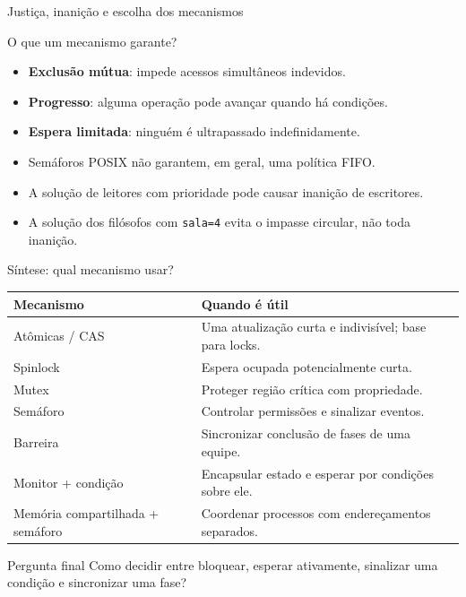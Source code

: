 \documentclass[aspectratio=169,11pt]{beamer}
\begin{document}
\begin{frame}{Justiça, inanição e escolha dos mecanismos}
\small
\begin{block}{O que um mecanismo garante?}
\begin{itemize}
\item \textbf{Exclusão mútua}: impede acessos simultâneos indevidos.
\item \textbf{Progresso}: alguma operação pode avançar quando há condições.
\item \textbf{Espera limitada}: ninguém é ultrapassado indefinidamente.
\end{itemize}
\end{block}
\begin{itemize}
\item Semáforos POSIX não garantem, em geral, uma política FIFO.
\item A solução de leitores com prioridade pode causar inanição de escritores.
\item A solução dos filósofos com \texttt{sala=4} evita o impasse circular, não toda inanição.
\end{itemize}
\end{frame}

\begin{frame}{Síntese: qual mecanismo usar?}
\scriptsize
\begin{tabular}{p{2.8cm}p{6.9cm}}
\toprule
\textbf{Mecanismo} & \textbf{Quando é útil}\\
\midrule
Atômicas / CAS & Uma atualização curta e indivisível; base para locks.\\
Spinlock & Espera ocupada potencialmente curta.\\
Mutex & Proteger região crítica com propriedade.\\
Semáforo & Controlar permissões e sinalizar eventos.\\
Barreira & Sincronizar conclusão de fases de uma equipe.\\
Monitor + condição & Encapsular estado e esperar por condições sobre ele.\\
Memória compartilhada + semáforo & Coordenar processos com endereçamentos separados.\\
\bottomrule
\end{tabular}
\vspace{.3cm}
\begin{alertblock}{Pergunta final}
Como decidir entre bloquear, esperar ativamente, sinalizar uma condição e sincronizar uma fase?
\end{alertblock}
\end{frame}
\end{document}

